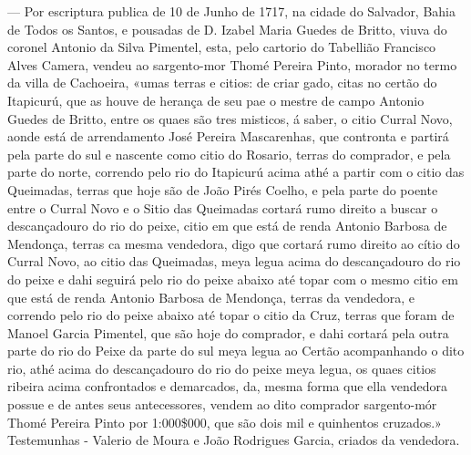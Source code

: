 — Por escriptura publica de 10 de Junho de 1717, na cidade do Salvador, Bahia de Todos os Santos, e pousadas de D. Izabel Maria Guedes de Britto, viuva do coronel Antonio da Silva Pimentel, esta, pelo cartorio do Tabellião Francisco Alves Camera, vendeu ao sargento-mor Thomé Pereira Pinto, morador no termo da villa de Cachoeira, «umas terras e citios: de criar gado, citas no certão do Itapicurú, que as houve de herança de seu pae o mestre de campo Antonio Guedes de Britto, entre os quaes são tres misticos, á saber, o citio Curral Novo, aonde está de arrendamento José Pereira Mascarenhas, que contronta e partirá pela parte do sul e nascente como citio do Rosario, terras do comprador, e pela parte do norte, correndo pelo rio do Itapicurú acima athé a partir com o citio das Queimadas, terras que hoje são de João Pirés Coelho, e pela parte do poente entre o Curral Novo e o Sitio das Queimadas cortará rumo direito a buscar o descançadouro do rio do peixe, citio em que está de renda Antonio Barbosa de Mendonça, terras ca mesma vendedora, digo que cortará rumo direito ao cítio do Curral Novo, ao citio das Queimadas, meya legua acima do descançadouro do rio do peixe e dahi seguirá pelo rio do peixe abaixo até topar com o mesmo citio em que está de renda Antonio Barbosa de Mendonça, terras da vendedora, e correndo pelo rio do peixe abaixo até topar o citio da Cruz, terras que foram de Manoel Garcia Pimentel, que são hoje do comprador, e dahi cortará pela outra parte do rio do Peixe da parte do sul meya legua ao Certão acompanhando o dito rio, athé acima do descançadouro do rio do peixe meya legua, os quaes citios ribeira acima confrontados e demarcados, da, mesma forma que ella vendedora possue e de antes seus antecessores, vendem ao dito comprador sargento-mór Thomé Pereira Pinto por 1:000\$000, que são dois mil e quinhentos cruzados.» Testemunhas - Valerio de Moura e João Rodrigues Garcia, criados da vendedora.

